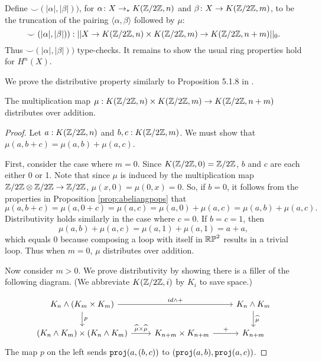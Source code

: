 \documentclass{amsart}
\begin{document}
Define
$ \smile ( |\alpha|, |\beta|) ) $, for
$ \alpha \colon X \to_\ast K(\mathbb{Z}/2\mathbb{Z},n) $ and
$ \beta \colon X \to K(\mathbb{Z}/2\mathbb{Z},m) $, to be the truncation of the
pairing $ \langle \alpha, \beta \rangle $ followed by $ \mu $:
\[
\smile ( |\alpha|, |\beta|) ) :
|| X \to K(\mathbb{Z}/2\mathbb{Z},n) \times K(\mathbb{Z}/2\mathbb{Z},m) \to K(\mathbb{Z}/2\mathbb{Z},n+m) ||_0.
\]
Thus $ \smile ( |\alpha|, |\beta|) ) $ type-checks. It
remains to show the usual ring properties hold for $ H^n(X)
$.  

We prove the distributive property similarly to Proposition 5.1.8 in \cite{brunerie:thesis}.
\begin{proposition}
	The multiplication map ${\mu}:K(\mathbb{Z}/2\mathbb{Z},n)\times K(\mathbb{Z}/2\mathbb{Z},m)\to K(\mathbb{Z}/2\mathbb{Z},n+m)$ distributes over addition.
	\end{proposition}

\begin{proof} Let $a:K(\mathbb{Z}/2\mathbb{Z},n)$ and $b,c:K(\mathbb{Z}/2\mathbb{Z},m)$. We must show that $\mu(a,b+c)=\mu(a,b)+\mu(a,c)$. 
	
	First, consider the case where $m=0$. Since $K(\mathbb{Z}/2\mathbb{Z},0)=\mathbb{Z}/2\mathbb{Z}$, $b$ and $c$ are each either 0 or 1. Note that since $\mu$ is induced by the multiplication map $\mathbb{Z}/2\mathbb{Z}\otimes\mathbb{Z}/2\mathbb{Z}\to\mathbb{Z}/2\mathbb{Z}$, $\mu(x,0)=\mu(0,x)=0$. So, if $b=0$, it follows from the properties in Proposition \ref{prop:abeliangpops} that \[\mu(a,b+c)=\mu(a,0+c)=\mu(a,c)=\mu(a,0)+\mu(a,c)=\mu(a,b)+\mu(a,c).\]
	Distributivity holds similarly in the case where $c=0$. If $b=c=1$, then
	\[\mu(a,b)+\mu(a,c)=\mu(a,1)+\mu(a,1)=a+a,\]
	which equals 0 because composing a loop with itself in $\mathbb{RP}^2$ results in a trivial loop. Thus when $m=0$, $\mu$ distributes over addition.
	
	Now consider $m>0$. We prove distributivity by showing there is a filler of the following diagram. (We abbreviate $K(\mathbb{Z}/2\mathbb{Z},i)$ by $K_i$ to save space.)
	
	\[\begin{tikzcd}
	K_n\wedge\left(K_m\times K_m\right) \arrow[rr,"id\wedge+"] \arrow[d,"p"]&  & K_n\wedge K_m\arrow[d,"\widehat{\mu}"]\\
	\left(K_n\wedge K_m\right)\times\left(K_n\wedge K_m\right)\arrow[r,"\widehat{\mu}\times\widehat{\mu}"] & K_{n+m}\times K_{n+m}\arrow[r,"+"] &K_{n+m}	
	\end{tikzcd}\]
	The map $p$ on the left sends $\mathtt{proj}(a,(b,c))$ to $(\mathtt{proj}(a,b),\mathtt{proj}(a,c))$. 
	
	

\end{proof}
\end{document}
